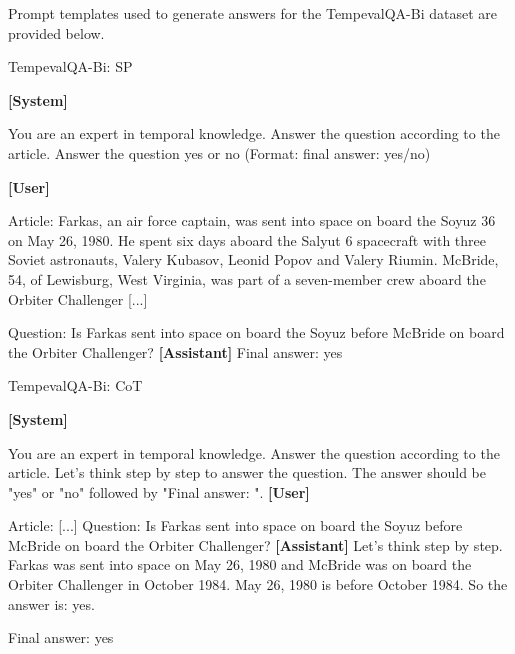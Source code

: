 
Prompt templates used to generate answers for the TempevalQA-Bi dataset are provided below.

\begin{myColorbox}[]{TempevalQA-Bi: SP}

\textbf{[System]}

You are an expert in temporal knowledge. Answer the question according to the article. Answer the question yes or no (Format: final answer: yes/no)

\textbf{[User]}

Article: Farkas, an air force captain, was sent into space on board the Soyuz 36 on May 26, 1980. He spent six days aboard the Salyut 6 spacecraft with three Soviet astronauts, Valery Kubasov, Leonid Popov and Valery Riumin. McBride, 54, of Lewisburg, West Virginia, was part of a seven-member crew aboard the Orbiter Challenger [...] 

Question: Is Farkas sent into space on board the Soyuz before McBride on board the Orbiter Challenger? 
\newline 
\textbf{[Assistant]}
\newline
Final answer: yes
\end{myColorbox}

\begin{myColorbox}[]{TempevalQA-Bi: CoT}

\textbf{[System]}

You are an expert in temporal knowledge. Answer the question according to the article. Let's think step by step to answer the question. The answer should be "yes" or "no" followed by "Final answer: ".\newline
\textbf{[User]}

Article: [...] \newline
Question: Is Farkas sent into space on board the Soyuz before McBride on board the Orbiter Challenger? \newline 
\textbf{[Assistant]}
\newline
Let's think step by step.
Farkas was sent into space on May 26, 1980 and McBride was on board the Orbiter Challenger in October 1984. May 26, 1980 is before October 1984. So the answer is: yes.

Final answer: yes

\end{myColorbox}

